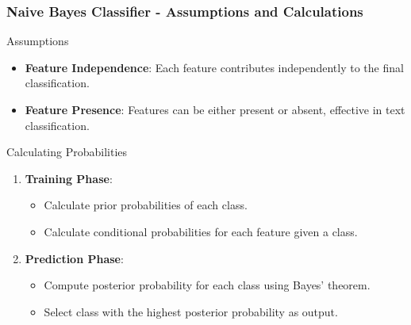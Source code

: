 \documentclass[aspectratio=169]{beamer}
\begin{document}
\begin{frame}[fragile]
  \frametitle{Naive Bayes Classifier - Assumptions and Calculations}
  \begin{block}{Assumptions}
    \begin{itemize}
      \item \textbf{Feature Independence}: Each feature contributes independently to the final classification.
      \item \textbf{Feature Presence}: Features can be either present or absent, effective in text classification.
    \end{itemize}
  \end{block}

  \begin{block}{Calculating Probabilities}
    \begin{enumerate}
      \item \textbf{Training Phase}:
      \begin{itemize}
        \item Calculate prior probabilities of each class.
        \item Calculate conditional probabilities for each feature given a class.
      \end{itemize}
      \item \textbf{Prediction Phase}:
      \begin{itemize}
        \item Compute posterior probability for each class using Bayes' theorem.
        \item Select class with the highest posterior probability as output.
      \end{itemize}
    \end{enumerate}
  \end{block}
\end{frame}
\end{document}

